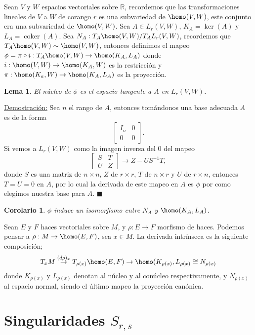 \documentclass{report}
\newtheorem{lem}[theorem]{Lema}
\newtheorem{coro}[theorem]{Corolario}
\theoremstyle{definition}
\DeclareMathOperator{\cok}{coker}
\let\hom\homo
\DeclareMathOperator{\hom}{Hom}
\begin{document}
Sean $V$ y $W$ espacios vectoriales sobre $\mathbb{R}$, recordemos que las transformaciones lineales de $V$ a $W$ de corango $r$ es una subvariedad de $\hom(V,W)$, este conjunto era una subvariedad de $\hom(V,W)$. Sea $A \in L_r (V,W)$, $K_A = \ker(A)$ y $L_A = \cok (A)$. Sea $N_A: T_A \hom(V,W)/ T_A L_r (V,W)$, recordemos que $T_A \hom(V,W) \sim \hom(V,W)$, entonces definimos el mapeo $\phi= \pi \circ i: T_A \hom (V,W) \to \hom (K_A, L_A)$ donde $i: \hom(V,W) \to \hom (K_A , W)$ es la restricci\'on y $\pi: \hom(K_a, W) \to \hom(K_A, L_A)$ es la proyecci\'on.

\begin{lem}
El n\'ucleo de $\phi$ es el espacio tangente a $A$ en $L_r (V,W)$.
\end{lem}

\underline{Demostraci\'on:} Sea $n$ el rango de $A$, entonces tom\'andonos una base adecuada $A$ es de la forma 
$$\begin{bmatrix}
I_n & 0\\
0 & 0
\end{bmatrix} .$$
Si vemos a $L_r(V,W)$ como la imagen inversa del $0$ del mapeo 
$$\begin{bmatrix}
S & T \\
U & Z
\end{bmatrix} \to Z - U S^{-1} T, $$
donde $S$ es una matriz de $n \times n$, $Z$ de $r \times r$, $T $ de $n \times r$ y $U$ de $r \times n$, entonces $T= U= 0$ en $A$, por lo cual la derivada de este mapeo en $A$ es $\phi$ por como elegimos nuestra base para $A$. $\blacksquare$

\begin{coro}
$\phi$ induce un isomorfismo entre $N_A $ y $\hom(K_A, L_A)$.
\end{coro}

Sean $E$ y $F$ haces vectoriales sobre $M$, y $\rho: E \to F$ morfismo de haces. Podemos pensar a $\rho:M \to \hom(E,F)$, sea $x \in M$. La derivada intr\'inseca es la siguiente composici\'on;
$$T_x M \overset{(d \rho)_x}{\to} T_{\rho(x)} \hom(E,F) \to \hom(K_{\rho(x)} , L_{\rho(x)} \cong N_{\rho(x)}$$
donde $K_{\rho(x)}$ y $L_{\rho(x)}$ denotan al n\'ucleo y al con\'ucleo respectivamente, y $N_{\rho(x)}$ al espacio normal, siendo el \'ultimo mapeo la proyecci\'on can\'onica.


\section{Singularidades $S_{r,s}$}
\end{document}
